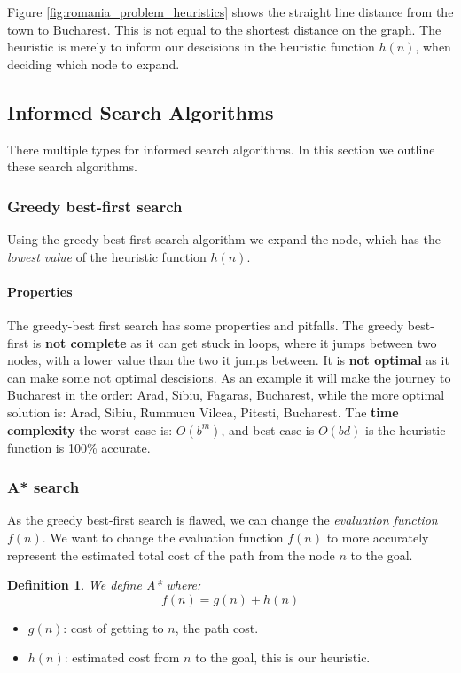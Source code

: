 \documentclass{article}
\newtheorem{definition}{Definition}[section]
\begin{document}
Figure \ref{fig:romania_problem_heuristics} shows the straight line distance
from the town to Bucharest. This is not equal to the shortest distance on the
graph. The heuristic is merely to inform our descisions in the heuristic
function $h(n)$, when deciding which node to expand.

\subsection{Informed Search Algorithms}%
\label{sub:informed_search_algorithms}

There multiple types for informed search algorithms. In this section we outline
these search algorithms.

\subsubsection{Greedy best-first search}%
\label{ssub:greedy_best_first_search}
Using the greedy best-first search algorithm we expand the node, which has the
\emph{lowest value} of the heuristic function $h(n)$.

\paragraph{Properties}%
\label{par:properties}

The greedy-best first search has some properties and pitfalls. The greedy
best-first is \textbf{not complete} as it can get stuck in loops, where it jumps
between two nodes, with a lower value than the two it jumps between. It is
\textbf{not optimal} as it can make some not optimal descisions. As an example
it will make the journey to Bucharest in the order: Arad, Sibiu, Fagaras,
Bucharest, while the more optimal solution is: Arad, Sibiu, Rummucu Vilcea,
Pitesti, Bucharest. The \textbf{time complexity}  the worst case is: $O(b^m)$,
and best case is $O(bd)$ is the heuristic function is 100\% accurate\cite[p.
12]{presentation:informed_search}.

\subsubsection{A* search}%
\label{ssub:a_search}

As the greedy best-first search is flawed, we can change the \emph{evaluation
function} $f(n)$. We want to change the evaluation function $f(n)$ to more
accurately represent the estimated total cost of the path from the node $n$ to
the goal.
\begin{definition}
  We define A* where:
  $$f(n) = g(n) + h(n)$$
\end{definition}
\begin{itemize}
  \item $g(n)$: cost of getting to $n$, the path cost.
  \item $h(n)$: estimated cost from $n$ to the goal, this is our heuristic.
\end{itemize}
\end{document}
